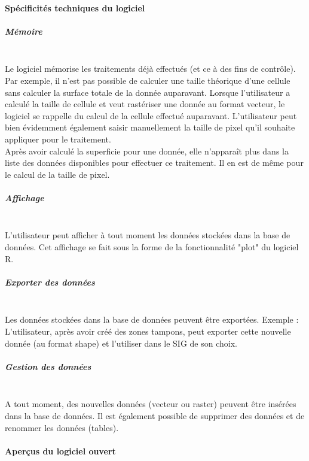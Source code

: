 \paragraph{Spécificités techniques du logiciel}

\subparagraph{Mémoire\\\\}

Le logiciel mémorise les traitements déjà effectués (et ce à des fins de contrôle). Par exemple, il n'est pas possible de calculer une taille théorique d'une cellule sans calculer la surface totale de la donnée auparavant. Lorsque l'utilisateur a calculé la taille de cellule et  veut rastériser une donnée au format vecteur, le logiciel se rappelle du calcul de la cellule effectué auparavant. L'utilisateur peut bien évidemment également saisir manuellement la taille de pixel qu'il souhaite appliquer pour le traitement. \\

Après avoir calculé la superficie pour une donnée, elle n'apparaît plus dans la liste des données disponibles pour effectuer ce traitement. Il en est de même pour le calcul de la taille de pixel.

\subparagraph{Affichage\\\\}

L'utilisateur peut afficher à tout moment les données stockées dans la base de données. Cet affichage se fait sous la forme de la fonctionnalité "plot" du logiciel R. 

\subparagraph{Exporter des données\\\\}

Les données stockées dans la base de données peuvent être exportées. Exemple : L'utilisateur, après avoir créé des zones tampons, peut exporter cette nouvelle donnée (au format shape) et l'utiliser dans le SIG de son choix.

\subparagraph{Gestion des données\\\\}

A tout moment, des nouvelles données (vecteur ou raster) peuvent être insérées dans la base de données. Il est également possible de supprimer des données et de renommer les données (tables).

\paragraph{Aperçus du logiciel ouvert\\\\}

